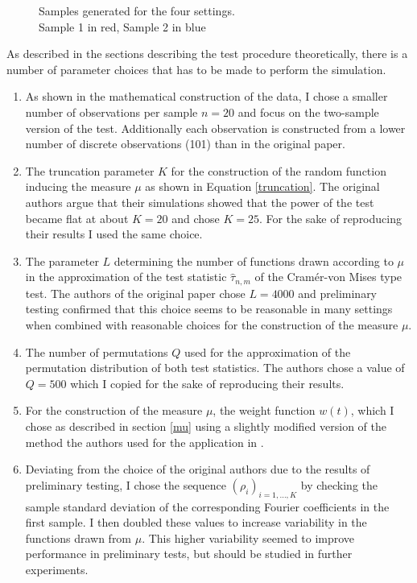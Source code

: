 \documentclass[12pt, a4paper]{article}
\theoremstyle{MAstyle} \newtheorem{assumption}{Assumption}[section]
\theoremstyle{MAstyle} \newtheorem{definition}{Definition}[section]
\theoremstyle{MAstyle} \newtheorem{theorem}{Theorem}[section]
\begin{document}
		\begin{figure}[H]
			\caption{Samples generated for the four settings. \\
			Sample 1 in red, Sample 2 in blue}
			\label{settings}
		\end{figure}
		As described in the sections describing the test procedure theoretically, there is a number of parameter choices that has to be made to perform the simulation.
		\begin{enumerate}
			\item As shown in the mathematical construction of the data, I chose a smaller number of observations per sample $n=20$ and focus on the two-sample version of the test. Additionally each observation is constructed from a lower number of discrete observations (101) than in the original paper.
			\item The truncation parameter $K$ for the construction of the random function inducing the measure $\mu$ as shown in Equation \ref{truncation}. The original authors argue that their simulations showed that the power of the test became flat at about $K = 20$ and chose $K = 25$. For the sake of reproducing their results I used the same choice.
			\item The parameter $L$ determining the number of functions drawn according to $\mu$ in the approximation of the test statistic $\hat{\tau}_{n,m}$ of the Cram\'{e}r-von Mises type test. The authors of the original paper chose $L = 4000$ and preliminary testing confirmed that this choice seems to be reasonable in many settings when combined with reasonable choices for the construction of the measure $\mu$.
			\item The number of permutations $Q$ used for the approximation of the permutation distribution of both test statistics. The authors chose a value of $Q = 500$ which I copied for the sake of reproducing their results.
			\item For the construction of the measure $\mu$, the weight function $w(t)$, which I chose as described in section \ref{mu} using a slightly modified version of the method the authors used for the application in \cite{bugni_permutation_2021}.
			\item Deviating from the choice of the original authors due to the results of preliminary testing, I chose the sequence $\left(\rho_i\right)_{i = 1, \dots, K}$ by checking the sample standard deviation of the corresponding Fourier coefficients in the first sample. I then doubled these values to increase variability in the functions drawn from $\mu$. This higher variability seemed to improve performance in preliminary tests, but should be studied in further experiments.

\end{enumerate}
\end{document}
